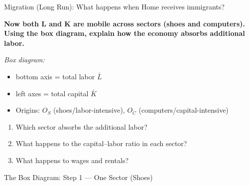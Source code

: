 \documentclass{beamer}
\begin{document}
\begin{frame}{Migration (Long Run): What happens when Home receives immigrants?}

\textbf{Now both L and K are mobile across sectors (shoes and computers). Using the box diagram, explain how the economy absorbs additional labor.}

\vspace{0.2cm}

\textit{Box diagram:} 
\begin{itemize}
    \item bottom axis = total labor $\bar{L}$ 
    \item left axes = total capital $\bar{K}$
    \item Origins: $O_S$ (shoes/labor-intensive), $O_C$ (computers/capital-intensive)
\end{itemize}

\vspace{0.1cm}

\begin{enumerate}
    \item Which sector absorbs the additional labor?
    \item What happens to the capital--labor ratio in each sector?
    \item What happens to wages and rentals?
\end{enumerate}

\end{frame}





\begin{frame}{The Box Diagram: Step 1 — One Sector (Shoes)}

\begin{center}
\end{center}
\end{frame}
\end{document}

